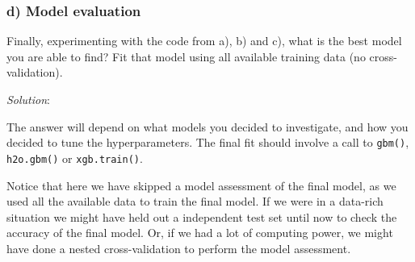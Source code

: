 \documentclass[
]{article}
\newenvironment{Shaded}{\begin{snugshade}}{\end{snugshade}}
\newcommand{\CommentTok}[1]{\textcolor[rgb]{0.56,0.35,0.01}{\textit{#1}}}
\newcommand{\DecValTok}[1]{\textcolor[rgb]{0.00,0.00,0.81}{#1}}
\newcommand{\FunctionTok}[1]{\textcolor[rgb]{0.13,0.29,0.53}{\textbf{#1}}}
\newcommand{\NormalTok}[1]{#1}
\newcommand{\SpecialCharTok}[1]{\textcolor[rgb]{0.81,0.36,0.00}{\textbf{#1}}}
\begin{document}
\begin{Shaded}
\end{Shaded}

\subsubsection{d) Model evaluation}\label{d-model-evaluation}

Finally, experimenting with the code from a), b) and c), what is the
best model you are able to find? Fit that model using all available
training data (no cross-validation).

\emph{Solution}:

The answer will depend on what models you decided to investigate, and
how you decided to tune the hyperparameters. The final fit should
involve a call to \texttt{gbm()}, \texttt{h2o.gbm()} or
\texttt{xgb.train()}.

Notice that here we have skipped a model assessment of the final model,
as we used all the available data to train the final model. If we were
in a data-rich situation we might have held out a independent test set
until now to check the accuracy of the final model. Or, if we had a lot
of computing power, we might have done a nested cross-validation to
perform the model assessment.
\end{document}
